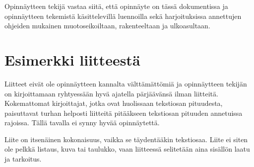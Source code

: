\documentclass[finnish,12pt,a4paper,pdftex]{article}
\begin{document}
Opinnäytteen tekijä vastaa siitä, että opinnäyte on tässä dokumentissa
ja opinnäytteen tekemistä käsittelevillä luennoilla sekä
harjoituksissa annettujen ohjeiden mukainen muotoseikoiltaan,
rakenteeltaan ja ulkoasultaan.



\clearpage





\appendix 
\clearpage

\section{Esimerkki liitteestä\label{LiiteA}}
\renewcommand{\theequation}{A\arabic{equation}}
\setcounter{equation}{0}  
\renewcommand{\thefigure}{A\arabic{figure}}
\setcounter{figure}{0}
\renewcommand{\thetable}{A\arabic{table}}
\setcounter{table}{0}

Liitteet eivät ole opinnäytteen kannalta välttämättömiä ja 
opinnäytteen tekijän on 
kirjoittamaan ryhtyessään hyvä ajatella pärjäävänsä ilman liitteitä.
Kokemattomat kirjoittajat, jotka ovat huolissaan
tekstiosan pituudesta, paisuttavat turhan 
helposti liitteitä pitääkseen tekstiosan pituuden annetuissa rajoissa.
Tällä tavalla ei synny hyvää opinnäytettä.   

Liite on itsenäinen kokonaisuus, vaikka se täydentääkin tekstiosaa.
Liite ei siten ole pelkkä listaus, kuva tai taulukko, vaan 
liitteessä selitetään aina sisällön laatu ja tarkoitus. 
\end{document}
